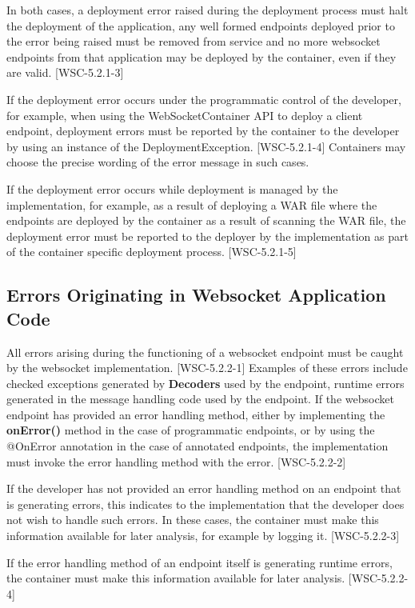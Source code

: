 In both cases, a deployment error raised during the deployment process must halt the deployment of the application, any well formed endpoints deployed prior to the error being raised must be removed from service and no more websocket endpoints from that application may be deployed by the container, even if they are valid. [WSC-5.2.1-3]

If the deployment error occurs under the programmatic control of the developer, for example, when using the WebSocketContainer API to deploy a client endpoint, deployment errors must be reported by the container to the developer by using an instance of the DeploymentException. [WSC-5.2.1-4] Containers may choose the precise wording of the error message in such cases.

If the deployment error occurs while deployment is managed by the implementation, for example, as a result of deploying a WAR file where the endpoints are deployed by the container as a result of scanning the WAR file, the deployment error must be reported to the deployer by the implementation as part of the container specific deployment process.  [WSC-5.2.1-5]

\subsection{Errors Originating in Websocket Application Code}

All errors arising during the functioning of a websocket endpoint must be caught by the websocket implementation. [WSC-5.2.2-1] Examples of these errors include checked exceptions generated by \textbf{Decoders} used by the endpoint, runtime errors generated in the message handling code used by the endpoint. If the websocket endpoint has provided an error handling method, either by implementing the \textbf{onError()} method in the case of programmatic endpoints, or by using the @OnError annotation in the case of annotated endpoints, the implementation must invoke the error handling method with the error. [WSC-5.2.2-2]

If the developer has not provided an error handling method on an endpoint that is generating errors, this indicates to the implementation that the developer does not wish to handle such errors. In these cases, the container must make this information available for later analysis, for example by logging it. [WSC-5.2.2-3]

If the error handling method of an endpoint itself is generating runtime errors, the container must make this information available for later analysis.  [WSC-5.2.2-4]

